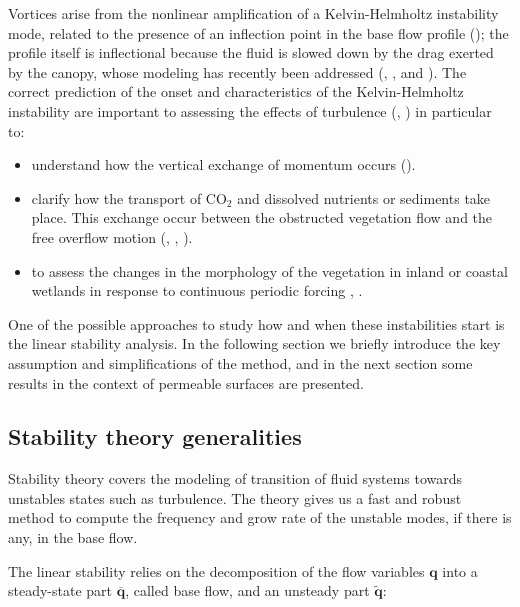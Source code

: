 Vortices arise from the nonlinear amplification of a Kelvin-Helmholtz instability mode, related to the presence of an inflection point in the base flow profile (\citet{asaeda2005morphological}); the profile itself is inflectional because the fluid is slowed down by the drag exerted by the canopy, whose modeling has recently been addressed (\citet{py2004mixing}, \citet{singh2016linear},  \citet{zampogna2016instability} and \citet{tilton2008linear}).
The correct prediction of the onset and characteristics of the Kelvin-Helmholtz instability are important to assessing the effects of turbulence (\citet{finnigan2000turbulence}, \citet{jimenez2001turbulent}) in particular to:

\begin{itemize}
	\item understand how the vertical exchange of momentum occurs (\citet{ikeda1996three}).
	\item clarify how the transport of $\text{CO}_2$ and dissolved nutrients or sediments take place. This exchange occur between the
	obstructed vegetation flow and the free overflow motion (\citet{gambi1990flume}, \citet{eckman1987role}, \citet{grizzle1996hydrodynamically}).
	\item to assess the changes in the morphology of the vegetation in inland or coastal wetlands in
	response to continuous periodic forcing \citet{asaeda2005morphological}, \citet{patil2010characteristics}.
\end{itemize}

One of the possible approaches to study how and when these instabilities start is the linear stability analysis. In the following section we briefly introduce the key assumption and simplifications of the method, and in the next section some results in the context of permeable surfaces are presented.


\subsection{Stability theory generalities}

Stability theory covers the modeling of transition of fluid systems towards unstables states such as turbulence.
The theory gives us a fast and robust method to compute the frequency and grow rate of the unstable modes, if there is any, in the base flow.

The linear stability relies on the decomposition of the flow variables $\mathbf{q}$ into a steady-state part $\overline{\mathbf{q}}$, called base flow, and an unsteady part $\widetilde{\mathbf{q}}$:

